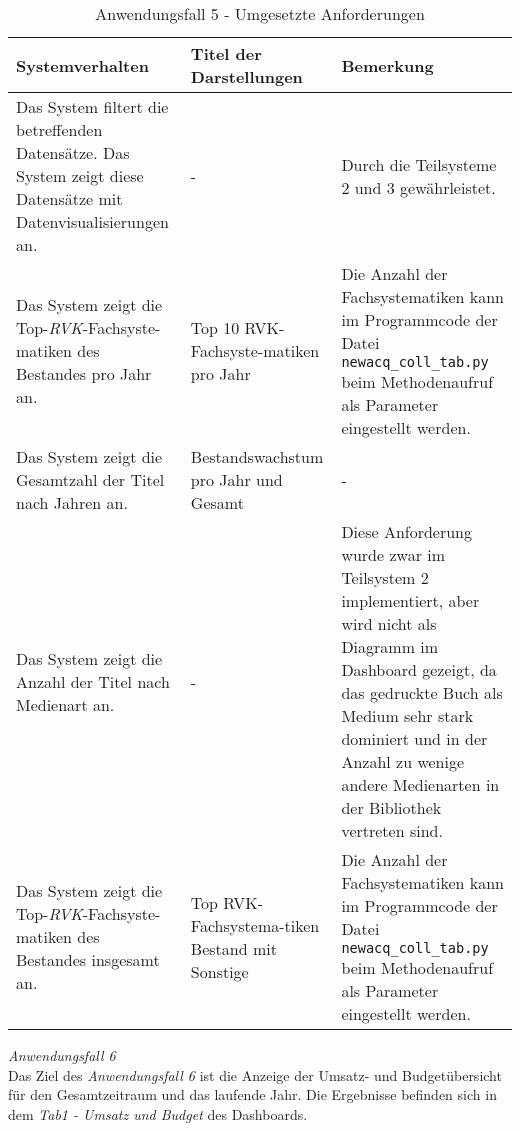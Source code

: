 \begingroup
    \setlength{\tabcolsep}{12pt} %
    \renewcommand{\arraystretch}{1.5} 
    \begin{table}[h]
        \centering
        \Large
        \begin{adjustbox}{max width=\textwidth}
        \begin{tabular}{p{}p{}p{}}
           \toprule
           Systemverhalten       &Titel der Darstellungen&Bemerkung\\
           \midrule
           Das System filtert die betreffenden Datensätze. Das System zeigt diese Datensätze mit Datenvisualisierungen an.&-&Durch die Teilsysteme 2 und 3 gewährleistet.\\
           Das System zeigt die Top-\textit{\acrshort{RVK}}-Fachsyste-matiken des Bestandes pro Jahr an.&Top 10 RVK-Fachsyste-matiken pro Jahr&Die Anzahl der Fachsystematiken kann im Programmcode der Datei \texttt{newacq\_coll\_tab.py} beim Methodenaufruf als Parameter eingestellt werden.\\
           Das System zeigt die Gesamtzahl der Titel nach Jahren an.&Bestandswachstum pro Jahr und Gesamt&-\\
           Das System zeigt die Anzahl der Titel nach Medienart an.&-&Diese Anforderung wurde zwar im Teilsystem 2 implementiert, aber wird nicht als Diagramm im Dashboard gezeigt, da das gedruckte Buch als Medium sehr stark dominiert und in der Anzahl zu wenige andere Medienarten in der Bibliothek vertreten sind.\\
           Das System zeigt die Top-\textit{\acrshort{RVK}}-Fachsyste-matiken des Bestandes insgesamt an.&Top RVK-Fachsystema-tiken Bestand mit Sonstige&Die Anzahl der Fachsystematiken kann im Programmcode der Datei \texttt{newacq\_coll\_tab.py} beim Methodenaufruf als Parameter eingestellt werden.\\
        \bottomrule
        \end{tabular}
        \end{adjustbox}
        \caption{%
            Anwendungsfall 5 - Umgesetzte Anforderungen
        }
        \label{tab:Anwendungsfall 5 - Umgesetzte Anforderungen}
        \end{table}
\endgroup

\clearpage
\noindent
\textit{Anwendungsfall 6}\\
Das Ziel des \textit{Anwendungsfall 6} ist die Anzeige der Umsatz- und Budgetübersicht für den Gesamtzeitraum und das laufende Jahr.
Die Ergebnisse befinden sich in dem \textit{Tab1 - Umsatz und Budget} des Dashboards.

